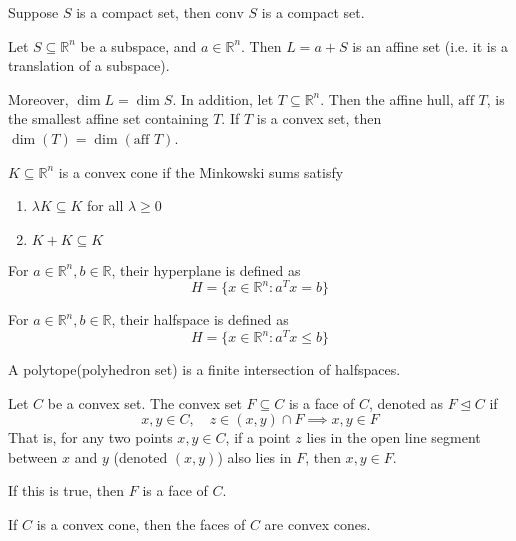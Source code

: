 \begin{lemma}
    Suppose $S$ is a compact set, then $\text{conv }S$ is a compact set.
\end{lemma}
\begin{definition}
    Let $S \subseteq \mathbb R^n$ be a subspace, and $a \in \mathbb R^n$. Then $L = a + S$ is an affine set (i.e. it is a translation of a subspace).

    Moreover, $\dim L = \dim S$. In addition, let $T \subseteq \mathbb R^n$. Then the affine hull, $\text{aff }T$, is the smallest affine set containing $T$. If $T$ is a convex set, then $\dim(T) = \dim(\text{aff }T)$.
\end{definition}
\begin{definition}
    $K \subseteq \mathbb R^n$ is a convex cone if the Minkowski sums satisfy
    \begin{enumerate}
        \item $\lambda K \subseteq K$ for all $\lambda \geq 0$
        \item $K + K \subseteq K$
    \end{enumerate}
\end{definition}
\begin{definition}[Hyperplane]
    For $a \in \mathbb R^n, b \in \mathbb R$, their hyperplane is defined as
    $$H = \{x \in \mathbb R^n: a^Tx = b\}$$
\end{definition}
\begin{definition}[Halfspace]
    For $a \in \mathbb R^n, b \in \mathbb R$, their halfspace is defined as
    $$H = \{x \in \mathbb R^n: a^Tx \leq b\}$$
\end{definition}
\begin{definition}[Polytope]
    A polytope(polyhedron set) is a finite intersection of halfspaces.
\end{definition}
\begin{definition}[Face]
    Let $C$ be a convex set. The convex set $F \subseteq C$ is a face of $C$, denoted as $F \unlhd C$ if $$x, y \in C, \quad z \in (x, y) \cap F \implies x, y \in F$$
    That is, for any two points $x,y \in C$, if a point $z$ lies in the open line segment between $x$ and $y$ (denoted $(x,y)$) also lies in $F$, then $x, y \in F$.

    If this is true, then $F$ is a face of $C$.
\end{definition}
\begin{theorem}[]
    If $C$ is a convex cone, then the faces of $C$ are convex cones.
\end{theorem}
